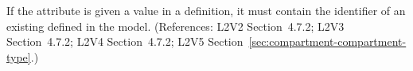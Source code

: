 If the  attribute is given a
value in a \Compartment definition, it must contain the identifier
of an existing \CompartmentType defined in the model.
(References: L2V2 Section~4.7.2; L2V3
Section~4.7.2; L2V4 Section~4.7.2; L2V5 Section~\ref{sec:compartment-compartment-type}.)

